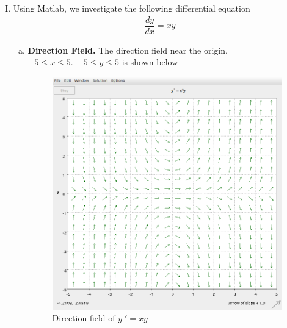\documentclass[a4paper,12pt]{article}
\begin{document}
\begin{enumerate}[I.]
  \item Using Matlab, we investigate the following differential equation
  \begin{align*}
    \dfrac{dy}{dx} = xy
  \end{align*}
  \begin{enumerate}[a)]
    \item \textbf{Direction Field.} The direction field near the origin, $-5 \leq x \leq 5. -5 \leq y \leq 5$ is shown below
    \begin{figure}[H]
      \begin{center}
        \includegraphics[scale=.3]{11.png}
        \caption{Direction field of $y\;' = xy$}
        \label{fig:1}
      \end{center}
    \end{figure}
    

\end{enumerate}
\end{enumerate}
\end{document}
